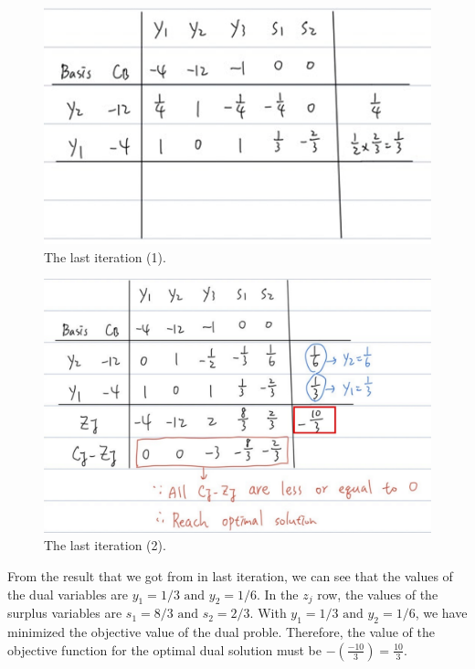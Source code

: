 \documentclass[a4paper,10pt]{article}
\begin{document}
\begin{enumerate}
\begin{enumerate}
{\begin{enumerate}
                \begin{figure}[H]
                    \centering
                    \includegraphics[scale=0.6]{./dual4.png}
                    \caption{The last iteration (1).}
                \end{figure}
                
                \begin{figure}[H]
                    \centering
                    \includegraphics[scale=0.3]{./dual5.png}
                    \caption{The last iteration (2).}
                \end{figure}

                From the result that we got from in last iteration, we can see that the values of the dual variables are $y_1 = 1/3 \text{ and } y_2 = 1/6$. In the $z_j$ row, the values of the surplus variables are $s_1=8/3 \text{ and } s_2=2/3$. 
                With $y_1 = 1/3 \text{ and } y_2 = 1/6$, we have minimized the objective value of the dual proble. Therefore, the value of the objective function for the optimal dual solution must be $-(\frac{-10}{3}) = \frac{10}{3}$.
            \end{enumerate}

}
\end{enumerate}
\end{enumerate}
\end{document}
